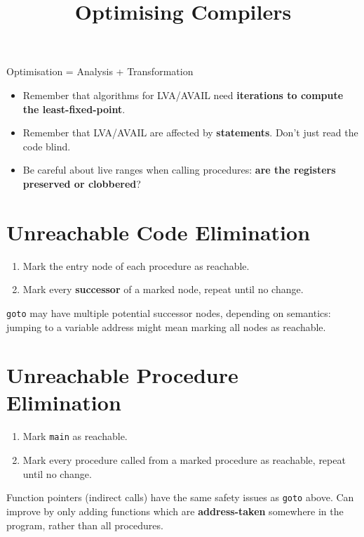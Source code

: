 \documentclass[a4paper, 11pt]{article}
\title{\vspace{-2.5cm}Optimising Compilers\vspace{-2cm}}
\author{}
\date{}
\begin{document}
\maketitle

Optimisation = Analysis + Transformation

\begin{itemize}
\item Remember that algorithms for LVA/AVAIL need \textbf{iterations to compute the least-fixed-point}.
\item Remember that LVA/AVAIL are affected by \textbf{ statements}. Don't just read the code blind.
\item Be careful about live ranges when calling procedures: \textbf{are the registers preserved or clobbered}?
\end{itemize}

\section*{Unreachable Code Elimination}
{
    \begin{enumerate}
    \item Mark the entry node of each procedure as reachable.
    \item Mark every \textbf{successor} of a marked node, repeat until no change.
    \end{enumerate}

    \texttt{goto} may have multiple potential successor nodes, depending on semantics: jumping to a variable address might mean marking all nodes as reachable.
}
\section*{Unreachable Procedure Elimination}
{
    \begin{enumerate}
    \item Mark \texttt{main} as reachable.
    \item Mark every procedure called from a marked procedure as reachable, repeat until no change.
    \end{enumerate}

    Function pointers (indirect calls) have the same safety issues as \texttt{goto} above. Can improve by only adding functions which are \textbf{address-taken} somewhere in the program, rather than all procedures.
}
\end{document}

